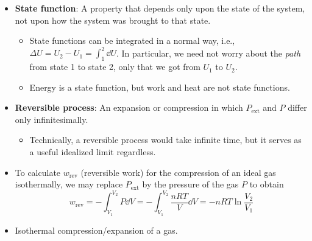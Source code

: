\documentclass[../notes.tex]{subfiles}
\begin{document}
\begin{itemize}
\begin{itemize}
    \end{itemize}
    \item \textbf{State function}: A property that depends only upon the state of the system, not upon how the system was brought to that state.
    \begin{itemize}
        \item State functions can be integrated in a normal way, i.e., $\Delta U=U_2-U_1=\int_1^2\dd{U}$. In particular, we need not worry about the \emph{path} from state 1 to state 2, only that we got from $U_1$ to $U_2$.
        \item Energy is a state function, but work and heat are not state functions.
    \end{itemize}
    \item \textbf{Reversible process}: An expansion or compression in which $P_\text{ext}$ and $P$ differ only infinitesimally.
    \begin{itemize}
        \item Technically, a reversible process would take infinite time, but it serves as a useful idealized limit regardless.
    \end{itemize}
    \item To calculate $w_\text{rev}$ (reversible work) for the compression of an ideal gas isothermally, we may replace $P_\text{ext}$ by the pressure of the gas $P$ to obtain
    \begin{equation*}
        w_\text{rev} = -\int_{V_1}^{V_2}P\dd{V}
        = -\int_{V_1}^{V_2}\frac{nRT}{V}\dd{V}
        = -nRT\ln\frac{V_2}{V_1}
    \end{equation*}
    \item Isothermal compression/expansion of a gas.
    \begin{figure}[h!]
        \centering
        \begin{subfigure}[b]{0.3\linewidth}
            \centering
\end{subfigure}
\end{figure}
\end{itemize}
\end{document}

